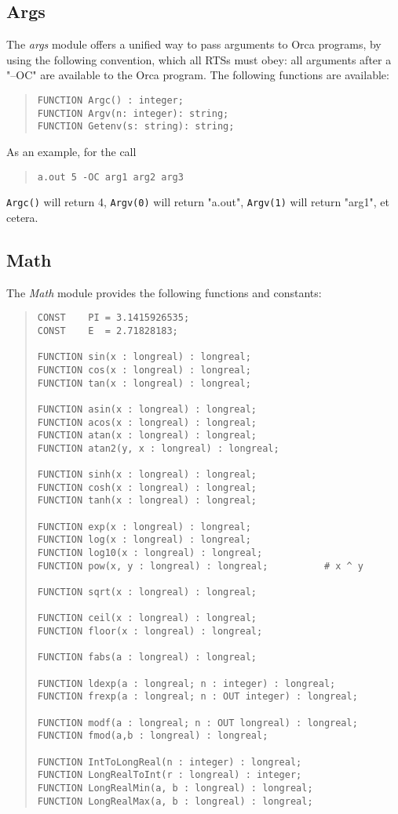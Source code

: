 \documentclass[10pt]{article}
\begin{document}
\subsection{Args}\label{mod:args}

The {\em args} module offers a unified way to pass arguments to Orca programs,
by using the following convention, which all RTSs must obey: all arguments
after a "--OC" are available to the Orca program.
The following functions are available:
\begin{quote}
\begin{verbatim}
FUNCTION Argc() : integer;
FUNCTION Argv(n: integer): string;
FUNCTION Getenv(s: string): string;
\end{verbatim}
\end{quote}
As an example, for the call
\begin{quote}
\begin{verbatim}
a.out 5 -OC arg1 arg2 arg3
\end{verbatim}
\end{quote}
\verb+Argc()+ will return 4, \verb+Argv(0)+ will return "a.out",
\verb+Argv(1)+ will return "arg1", et cetera.

\subsection{Math}

The {\em Math} module provides the following functions and constants:
\begin{quote}
\begin{verbatim}
CONST    PI = 3.1415926535;
CONST    E  = 2.71828183;

FUNCTION sin(x : longreal) : longreal;
FUNCTION cos(x : longreal) : longreal;
FUNCTION tan(x : longreal) : longreal;

FUNCTION asin(x : longreal) : longreal;
FUNCTION acos(x : longreal) : longreal;
FUNCTION atan(x : longreal) : longreal;
FUNCTION atan2(y, x : longreal) : longreal;

FUNCTION sinh(x : longreal) : longreal;
FUNCTION cosh(x : longreal) : longreal;
FUNCTION tanh(x : longreal) : longreal;

FUNCTION exp(x : longreal) : longreal;
FUNCTION log(x : longreal) : longreal;
FUNCTION log10(x : longreal) : longreal;
FUNCTION pow(x, y : longreal) : longreal;          # x ^ y

FUNCTION sqrt(x : longreal) : longreal;

FUNCTION ceil(x : longreal) : longreal;
FUNCTION floor(x : longreal) : longreal;

FUNCTION fabs(a : longreal) : longreal;

FUNCTION ldexp(a : longreal; n : integer) : longreal;
FUNCTION frexp(a : longreal; n : OUT integer) : longreal;

FUNCTION modf(a : longreal; n : OUT longreal) : longreal;
FUNCTION fmod(a,b : longreal) : longreal;

FUNCTION IntToLongReal(n : integer) : longreal;
FUNCTION LongRealToInt(r : longreal) : integer;
FUNCTION LongRealMin(a, b : longreal) : longreal;
FUNCTION LongRealMax(a, b : longreal) : longreal;
\end{verbatim}
\end{quote}
\end{document}
